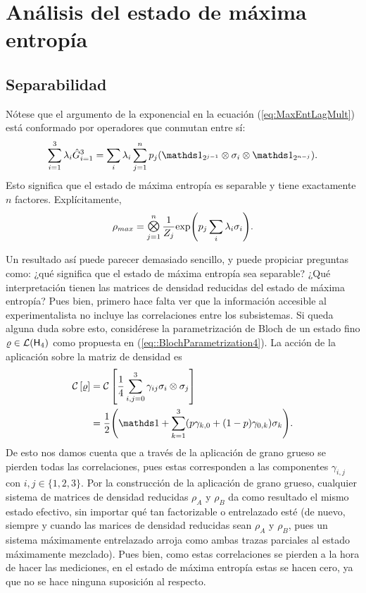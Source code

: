 \section{Análisis del estado de máxima entropía}

\subsection{Separabilidad}

Nótese que el argumento de la exponencial en la ecuación (\ref{eq:MaxEntLagMult}) está conformado por operadores que conmutan entre sí:
\begin{equation*}
    \sum_{i=1}^{3}\lambda_{i}\hat{G}_{i=1}^{3}=\sum_{i}\lambda_{i}\sum_{j=1}^{n}p_{j}(\Id_{2^{j-1}}\otimes\sigma_{i}\otimes\Id_{2^{n-j}}).
\end{equation*}
Esto significa que el estado de máxima entropía es separable y tiene exactamente $n$ factores. Explícitamente,
\begin{equation}\label{eq:MaxEntSeparable}
    \rho_{max}=\Motimes_{j=1}^{n}\frac{1}{Z_{j}}\text{exp}\qty(p_{j}\sum_{i}\lambda_{i}\sigma_{i}).
\end{equation}

Un resultado así puede parecer demasiado sencillo, y puede propiciar preguntas como: ¿qué significa que el estado de máxima entropía sea separable? ¿Qué interpretación tienen las matrices de densidad reducidas del estado de máxima entropía? Pues bien, primero hace falta ver que la información accesible al experimentalista no incluye las correlaciones entre los subsistemas. Si queda alguna duda sobre esto, considérese la parametrización de Bloch de un estado fino $\varrho\in\mathcal{L}({\sf H}_{4})$ como propuesta en (\ref{eq::BlochParametrization4}). La acción de la aplicación sobre la matriz de densidad es
\begin{align*}
    \CG{\varrho}&=\CG{\frac{1}{4}\sum_{i,j=0}^{3}\gamma_{ij}\pauli{i}\otimes \pauli{j}}\\
    &=\frac{1}{2}\qty(\Id+\sum_{k=1}^{3}(p\gamma_{k,0}+(1-p)\gamma_{0,k})\sigma_{k}).
\end{align*}
De esto nos damos cuenta que a través de la aplicación de grano grueso se pierden todas las correlaciones, pues estas corresponden a las componentes $\gamma_{i,j}$ con $i,j\in\{1,2,3\}$. Por la construcción de la aplicación de grano grueso, cualquier sistema de matrices de densidad reducidas $\rho_{A}$ y $\rho_{B}$ da como resultado el mismo estado efectivo, sin importar qué tan factorizable o entrelazado esté (de nuevo, siempre y cuando las marices de densidad reducidas sean $\rho_{A}$ y $\rho_{B}$, pues un sistema máximamente entrelazado arroja como ambas trazas parciales al estado máximamente mezclado). Pues bien, como estas correlaciones se pierden a la hora de hacer las mediciones, en el estado de máxima entropía estas se hacen cero, ya que no se hace ninguna suposición al respecto. 

